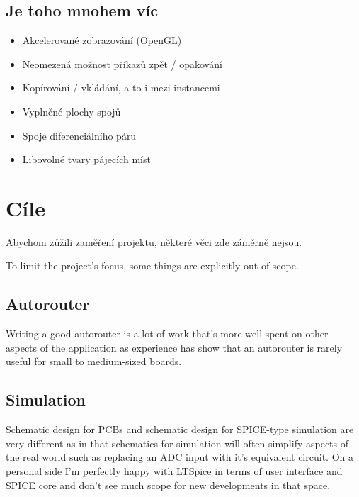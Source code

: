 \documentclass[letterpaper,10pt,czech]{sphinxmanual}
\begin{document}
\noindent{}


\section{Je toho mnohem víc}
\label{\detokenize{feature-overview:je-toho-mnohem-vic}}\begin{itemize}
\item {} 
Akcelerované zobrazování (OpenGL)

\item {} 
Neomezená možnost příkazů zpět / opakování

\item {} 
Kopírování / vkládání, a to i mezi instancemi

\item {} 
Vyplněné plochy spojů

\item {} 
Spoje diferenciálního páru

\item {} 
Libovolné tvary pájecích míst

\end{itemize}


\chapter{Cíle}
\label{\detokenize{non-goals:cile}}\label{\detokenize{non-goals::doc}}
Abychom zůžili zaměření projektu, některé věci zde záměrně nejsou.

To limit the project’s focus, some things are explicitly out of scope.


\section{Autorouter}
\label{\detokenize{non-goals:autorouter}}
Writing a good autorouter is a lot of work that’s more well spent on
other aspects of the application as experience has show that an
autorouter is rarely useful for small to medium-sized boards.


\section{Simulation}
\label{\detokenize{non-goals:simulation}}
Schematic design for PCBs and schematic design for SPICE-type
simulation are very different as in that schematics for simulation will
often simplify aspects of the real world such as replacing an ADC input
with it’s equivalent circuit. On a personal side I’m perfectly happy
with LTSpice in terms of user interface and SPICE core and don’t see much
scope for new developments in that space.
\end{document}
